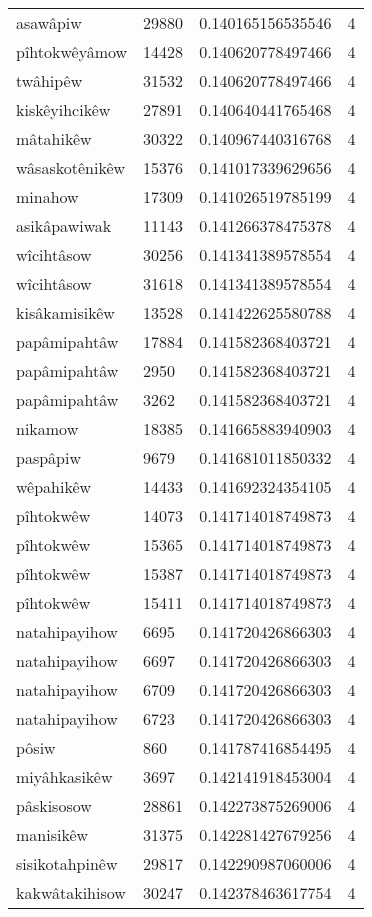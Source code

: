 \begin{longtable}{llll}
asawâpiw & 29880 & 0.140165156535546 & 4 \\
pîhtokwêyâmow & 14428 & 0.140620778497466 & 4 \\
twâhipêw & 31532 & 0.140620778497466 & 4 \\
kiskêyihcikêw & 27891 & 0.140640441765468 & 4 \\
mâtahikêw & 30322 & 0.140967440316768 & 4 \\
wâsaskotênikêw & 15376 & 0.141017339629656 & 4 \\
minahow & 17309 & 0.141026519785199 & 4 \\
asikâpawiwak & 11143 & 0.141266378475378 & 4 \\
wîcihtâsow & 30256 & 0.141341389578554 & 4 \\
wîcihtâsow & 31618 & 0.141341389578554 & 4 \\
kisâkamisikêw & 13528 & 0.141422625580788 & 4 \\
papâmipahtâw & 17884 & 0.141582368403721 & 4 \\
papâmipahtâw & 2950 & 0.141582368403721 & 4 \\
papâmipahtâw & 3262 & 0.141582368403721 & 4 \\
nikamow & 18385 & 0.141665883940903 & 4 \\
paspâpiw & 9679 & 0.141681011850332 & 4 \\
wêpahikêw & 14433 & 0.141692324354105 & 4 \\
pîhtokwêw & 14073 & 0.141714018749873 & 4 \\
pîhtokwêw & 15365 & 0.141714018749873 & 4 \\
pîhtokwêw & 15387 & 0.141714018749873 & 4 \\
pîhtokwêw & 15411 & 0.141714018749873 & 4 \\
natahipayihow & 6695 & 0.141720426866303 & 4 \\
natahipayihow & 6697 & 0.141720426866303 & 4 \\
natahipayihow & 6709 & 0.141720426866303 & 4 \\
natahipayihow & 6723 & 0.141720426866303 & 4 \\
pôsiw & 860 & 0.141787416854495 & 4 \\
miyâhkasikêw & 3697 & 0.142141918453004 & 4 \\
pâskisosow & 28861 & 0.142273875269006 & 4 \\
manisikêw & 31375 & 0.142281427679256 & 4 \\
sisikotahpinêw & 29817 & 0.142290987060006 & 4 \\
kakwâtakihisow & 30247 & 0.142378463617754 & 4 \\

\end{longtable}

